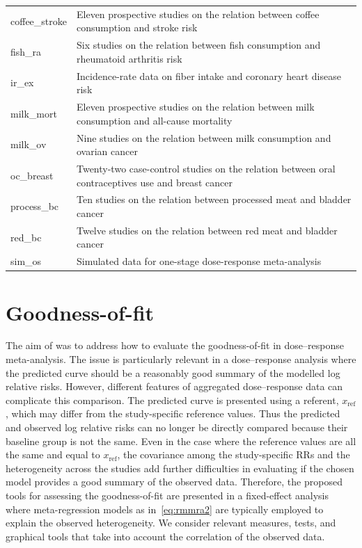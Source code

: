 \documentclass[11pt,a4paper,twoside,openany]{book}\usepackage{knitr}
\begin{document}
{\begin{knitrout}
\begin{table}
\begin{tabular}[t]{l>{\raggedright\arraybackslash}p{32em}}
coffee\_stroke & Eleven prospective studies on the relation between coffee consumption and stroke risk\\
fish\_ra & Six studies on the relation between fish consumption and rheumatoid arthritis risk\\
ir\_ex & Incidence-rate data on fiber intake and coronary heart disease risk\\
\addlinespace
milk\_mort & Eleven prospective studies on the relation between milk consumption and all-cause mortality\\
milk\_ov & Nine studies on the relation between milk consumption and ovarian cancer\\
oc\_breast & Twenty-two case-control studies on the relation between oral contraceptives use and breast cancer\\
process\_bc & Ten studies on the relation between processed meat and bladder cancer\\
red\_bc & Twelve studies on the relation between red meat and bladder cancer\\
sim\_os & Simulated data for one-stage dose-response meta-analysis\\
\bottomrule
\end{tabular}
\end{table}


\end{knitrout}



\section{Goodness-of-fit}\label{sec:gof}

The aim of  was to address how to evaluate the goodness-of-fit in dose--response meta-analysis. The issue is particularly relevant in a dose--response analysis where the predicted curve should be a reasonably good summary of the modelled log relative risks. However, different features of aggregated dose--response data can complicate this comparison. The predicted curve is presented using a referent, $x_\mathrm{ref}$, which may differ from the study-specific reference values. Thus the predicted and observed log relative risks can no longer be directly compared because their baseline group is not the same. Even in the case where the reference values are all the same and equal to $x_\mathrm{ref}$, the covariance among the study-specific RRs and the heterogeneity across the studies add further difficulties in evaluating if the chosen model provides a good summary of the observed data. Therefore, the proposed tools for assessing the goodness-of-fit are presented in a fixed-effect analysis where meta-regression models as in~\ref{eq:rmmra2} are typically employed to explain the observed heterogeneity. We consider relevant measures, tests, and graphical tools that take into account the correlation of the observed data.

}
\end{document}
